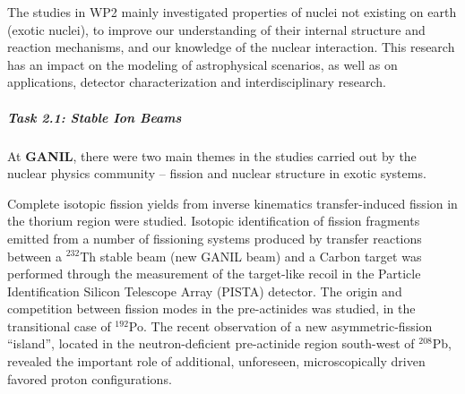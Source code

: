 The studies in WP2 mainly investigated properties of nuclei not existing on earth (exotic nuclei), to improve our understanding of their internal structure and reaction mechanisms, and our knowledge of the nuclear interaction. 
This research has an impact on the modeling of astrophysical scenarios, as well as on applications, detector characterization and interdisciplinary research. 

\subparagraph{Task 2.1: Stable Ion Beams} \mbox{}

At \textbf{GANIL}, there were two main themes in the studies carried out by the nuclear physics community – fission and nuclear structure in exotic systems. 

Complete isotopic fission yields from inverse kinematics transfer-induced fission in the thorium region were studied. Isotopic identification of fission fragments emitted from a number of fissioning systems produced by transfer reactions between a $^{232}$Th stable beam (new GANIL beam) and a 
Carbon target was performed through the measurement of the target-like recoil in the Particle Identification Silicon Telescope Array (PISTA) detector.  The origin and competition between fission modes in the pre-actinides was studied, in the transitional case of $^{192}$Po. The recent observation of a new asymmetric-fission “island”, located in the neutron-deficient pre-actinide region south-west of $^{208}$Pb, revealed the important role of additional, unforeseen, microscopically driven favored proton configurations. 


